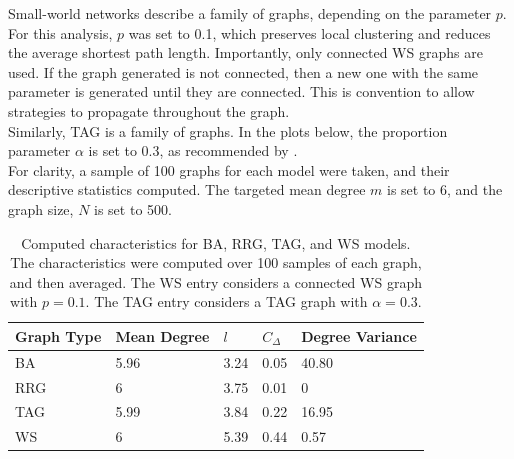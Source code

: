 Small-world networks describe a family of graphs, depending on the parameter $p$. For this analysis, $p$ was set to 0.1, which preserves local clustering and reduces the average shortest path length. Importantly, only connected WS graphs are used. If the graph generated is not connected, then a new one with the same parameter is generated until they are connected. This is convention to allow strategies to propagate throughout the graph. \\

Similarly, TAG is a family of graphs. In the plots below, the proportion parameter $\alpha$ is set to 0.3, as recommended by \cite{RN49}.\\

For clarity, a sample of 100 graphs for each model were taken, and their descriptive statistics computed. The targeted mean degree $m$ is set to 6, and the graph size, $N$ is set to 500. \\


\FloatBarrier

    

\begin{table}[!h]
\begin{center}
\begin{tabular}{|l|l|l|l|l|}
\hline
Graph Type & Mean Degree & $l$ & $C_\Delta$ & Degree Variance \\ \hline
BA         & 5.96        & 3.24                         & 0.05                   & 40.80           \\ \hline
RRG        & 6           & 3.75                         & 0.01                   & 0               \\ \hline
TAG        & 5.99        & 3.84                         & 0.22                   & 16.95           \\ \hline
WS         & 6           & 5.39                         & 0.44                   & 0.57            \\ \hline
\end{tabular}
\caption{Computed characteristics for BA, RRG, TAG, and WS models. The characteristics were computed over 100 samples of each graph, and then averaged. The WS entry considers a connected WS graph with $p=0.1$. The TAG entry considers a TAG graph with $\alpha = 0.3$. } \label{graph_stats}
\end{center}
\end{table}

\FloatBarrier

